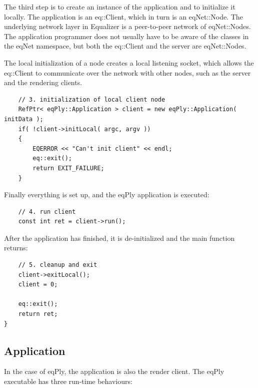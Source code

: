 \documentclass[10pt,a4]{scrartcl}
\begin{document}
The third step is to create an instance of the application and to
initialize it locally. The application is an \textsf{eq::Client}, which
in turn is an \textsf{eqNet::Node}. The underlying network layer in
Equalizer is a peer-to-peer network of \textsf{eqNet::Node}s. The
application programmer does not usually have to be aware of the classes
in the \textsf{eqNet} namespace, but both the \textsf{eq::Client} and
the server are \textsf{eqNet::Node}s. 

The local initialization of a node creates a local listening socket,
which allows the \textsf{eq::Client} to communicate over the network
with other nodes, such as the server and the rendering clients.

{\footnotesize\begin{lstlisting}
    // 3. initialization of local client node
    RefPtr< eqPly::Application > client = new eqPly::Application( initData );
    if( !client->initLocal( argc, argv ))
    {
        EQERROR << "Can't init client" << endl;
        eq::exit();
        return EXIT_FAILURE;
    }
\end{lstlisting}}%

Finally everything is set up, and the \textsf{eqPly} application is executed:

{\footnotesize\begin{lstlisting}
    // 4. run client
    const int ret = client->run();
\end{lstlisting}}

After the application has finished, it is de-initialized and the
\textsf{main} function returns:

{\footnotesize\begin{lstlisting}
    // 5. cleanup and exit
    client->exitLocal();
    client = 0;

    eq::exit();
    return ret;
}
\end{lstlisting}}


\subsection{Application}

In the case of \textsf{eqPly}, the application is also the render
client. The \textsf{eqPly} executable has three run-time behaviours:
\end{document}
